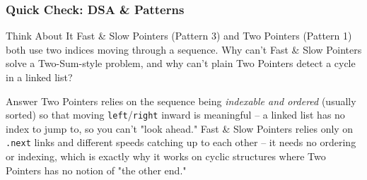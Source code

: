 \begin{frame}[fragile]\frametitle{Quick Check: DSA \& Patterns}
\begin{block}{Think About It}
Fast \& Slow Pointers (Pattern 3) and Two Pointers (Pattern 1) both use two indices moving through a sequence. Why can't Fast \& Slow Pointers solve a Two-Sum-style problem, and why can't plain Two Pointers detect a cycle in a linked list?
\end{block}
\pause
\begin{block}{Answer}
Two Pointers relies on the sequence being \emph{indexable and ordered} (usually sorted) so that moving \texttt{left}/\texttt{right} inward is meaningful -- a linked list has no index to jump to, so you can't "look ahead." Fast \& Slow Pointers relies only on \texttt{.next} links and different speeds catching up to each other -- it needs no ordering or indexing, which is exactly why it works on cyclic structures where Two Pointers has no notion of "the other end."
\end{block}
\end{frame}